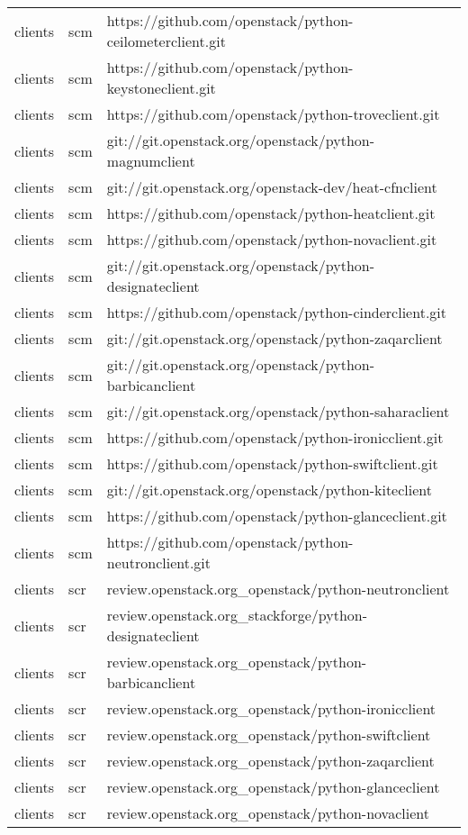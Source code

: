 \begin{center}
\begin{longtable}{|p{4cm}|p{1cm}|p{10cm}|}
clients&scm&https://github.com/openstack/python-ceilometerclient.git\\
clients&scm&https://github.com/openstack/python-keystoneclient.git\\
clients&scm&https://github.com/openstack/python-troveclient.git\\
clients&scm&git://git.openstack.org/openstack/python-magnumclient\\
clients&scm&git://git.openstack.org/openstack-dev/heat-cfnclient\\
clients&scm&https://github.com/openstack/python-heatclient.git\\
clients&scm&https://github.com/openstack/python-novaclient.git\\
clients&scm&git://git.openstack.org/openstack/python-designateclient\\
clients&scm&https://github.com/openstack/python-cinderclient.git\\
clients&scm&git://git.openstack.org/openstack/python-zaqarclient\\
clients&scm&git://git.openstack.org/openstack/python-barbicanclient\\
clients&scm&git://git.openstack.org/openstack/python-saharaclient\\
clients&scm&https://github.com/openstack/python-ironicclient.git\\
clients&scm&https://github.com/openstack/python-swiftclient.git\\
clients&scm&git://git.openstack.org/openstack/python-kiteclient\\
clients&scm&https://github.com/openstack/python-glanceclient.git\\
clients&scm&https://github.com/openstack/python-neutronclient.git\\
clients&scr&review.openstack.org\_openstack/python-neutronclient\\
clients&scr&review.openstack.org\_stackforge/python-designateclient\\
clients&scr&review.openstack.org\_openstack/python-barbicanclient\\
clients&scr&review.openstack.org\_openstack/python-ironicclient\\
clients&scr&review.openstack.org\_openstack/python-swiftclient\\
clients&scr&review.openstack.org\_openstack/python-zaqarclient\\
clients&scr&review.openstack.org\_openstack/python-glanceclient\\
clients&scr&review.openstack.org\_openstack/python-novaclient\\

\end{longtable}
\end{center}
